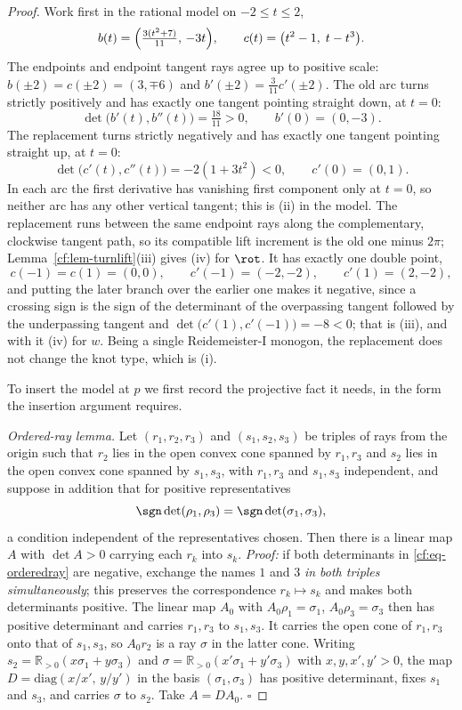 \begin{proof}\leanok{}
Work first in the rational model on $-2\leq t\leq2$,
\[
b(t)=\Bigl(\tfrac{3(t^2+7)}{11},\,-3t\Bigr),\qquad
c(t)=\bigl(t^2-1,\;t-t^3\bigr).
\]
The endpoints and endpoint tangent rays agree up to positive scale:
$b(\pm2)=c(\pm2)=(3,\mp6)$ and $b'(\pm2)=\frac3{11}c'(\pm2)$. The old arc turns
strictly positively and has exactly one tangent pointing straight down, at
$t=0$:
\[
\det\bigl(b'(t),b''(t)\bigr)=\tfrac{18}{11}>0,\qquad b'(0)=(0,-3).
\]
The replacement turns strictly negatively and has exactly one tangent pointing
straight up, at $t=0$:
\[
\det\bigl(c'(t),c''(t)\bigr)=-2(1+3t^2)<0,\qquad c'(0)=(0,1).
\]
In each arc the first derivative has vanishing first component only at $t=0$, so
neither arc has any other vertical tangent; this is (ii) in the model. The
replacement runs between the same endpoint rays along the complementary,
clockwise tangent path, so its compatible lift increment is the old one minus
$2\pi$; Lemma~\ref{cf:lem-turnlift}(iii) gives (iv) for $\rot$. It has exactly one double point,
\[
c(-1)=c(1)=(0,0),\qquad c'(-1)=(-2,-2),\qquad c'(1)=(2,-2),
\]
and putting the later branch over the earlier one makes it negative, since a
crossing sign is the sign of the determinant of the overpassing tangent followed
by the underpassing tangent and
$\det\bigl(c'(1),c'(-1)\bigr)=-8<0$; that is (iii), and with it (iv) for $w$.
Being a single Reidemeister-I monogon, the replacement does not change the knot
type, which is (i).

To insert the model at $p$ we first record the projective fact it needs, in the
form the insertion argument requires.

\emph{Ordered-ray lemma.} Let $(r_1,r_2,r_3)$ and $(s_1,s_2,s_3)$ be triples of
rays from the origin such that $r_2$ lies in the open convex cone spanned by
$r_1,r_3$ and $s_2$ lies in the open convex cone spanned by $s_1,s_3$, with
$r_1,r_3$ and $s_1,s_3$ independent, and suppose in addition that for positive
representatives
\begin{equation}
   \sgn\det(\rho_1,\rho_3)=\sgn\det(\sigma_1,\sigma_3),
\label{cf:eq-orderedray}
\end{equation}
a condition independent of the representatives chosen. Then there is a linear
map $A$ with $\det A>0$ carrying each $r_k$ into $s_k$.
\emph{Proof:} if both determinants in \eqref{cf:eq-orderedray} are negative,
exchange the names $1$ and $3$ \emph{in both triples simultaneously}; this
preserves the correspondence $r_k\mapsto s_k$ and makes both determinants
positive. The linear map $A_0$ with $A_0\rho_1=\sigma_1$, $A_0\rho_3=\sigma_3$
then has positive determinant and carries $r_1,r_3$ to $s_1,s_3$. It carries the
open cone of $r_1,r_3$ onto that of $s_1,s_3$, so $A_0r_2$ is a ray $\sigma$ in
the latter cone. Writing $s_2=\mathbb R_{>0}(x\sigma_1+y\sigma_3)$ and
$\sigma=\mathbb R_{>0}(x'\sigma_1+y'\sigma_3)$ with $x,y,x',y'>0$, the map
$D=\mathrm{diag}(x/x',\,y/y')$ in the basis $(\sigma_1,\sigma_3)$ has positive
determinant, fixes $s_1$ and $s_3$, and carries $\sigma$ to $s_2$. Take
$A=DA_0$. $\square$


\end{proof}
